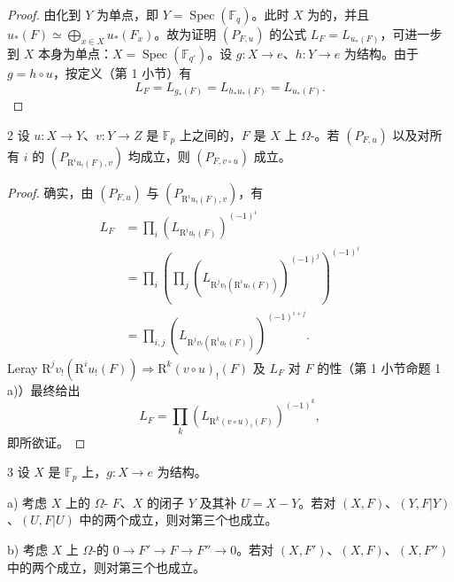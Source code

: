 \begin{proof}
由化到 $Y$ 为单点，即 $Y=\operatorname{Spec}(\mathbb F_q)$。此时 $X$ 为的，并且 $u_*(F)\simeq\bigoplus_{x\in X}u_*(F_x)$。故为证明 $(P_{F,u})$ 的公式 $L_F=L_{u_*(F)}$，可进一步到 $X$ 本身为单点：$X=\operatorname{Spec}(\mathbb F_{q'})$。设 $g:X\to e$、$h:Y\to e$ 为结构。由于 $g=h\circ u$，按定义（第 1 小节）有
\[
L_F=L_{g_*(F)}=L_{h_*u_*(F)}=L_{u_*(F)}.
\]
\end{proof}
\begin{SGAresult}{}{2}
设 $u:X\to Y$、$v:Y\to Z$ 是 $\mathbb F_p$ 上之间的，$F$ 是 $X$ 上 $\Omega$-。若 $(P_{F,u})$ 以及对所有 $i$ 的 $(P_{\mathrm R^iu_!(F),v})$ 均成立，则 $(P_{F,v\circ u})$ 成立。
\end{SGAresult}
\begin{proof}
确实，由 $(P_{F,u})$ 与 $(P_{\mathrm R^iu_!(F),v})$，有
\[
\begin{aligned}
L_F&=\prod_i(L_{\mathrm R^iu_!(F)})^{(-1)^i}\\
&=\prod_i\left(\prod_j(L_{\mathrm R^jv_!(\mathrm R^iu_!(F))})^{(-1)^j}\right)^{(-1)^i}\\
&=\prod_{i,j}(L_{\mathrm R^jv_!(\mathrm R^iu_!(F))})^{(-1)^{i+j}}.
\end{aligned}
\]
Leray  $\mathrm R^jv_!(\mathrm R^iu_!(F))\Rightarrow\mathrm R^k(v\circ u)_!(F)$ 及 $L_F$ 对 $F$ 的性（第 1 小节命题 1 a)）最终给出
\[
L_F=\prod_k(L_{\mathrm R^k(v\circ u)_!(F)})^{(-1)^k},
\]
即所欲证。
\end{proof}
\begin{SGAresult}{}{3}
设 $X$ 是 $\mathbb F_p$ 上，$g:X\to e$ 为结构。

a) 考虑 $X$ 上的 $\Omega$- $F$、$X$ 的闭子 $Y$ 及其补 $U=X-Y$。若对 $(X,F)$、$(Y,F|Y)$、$(U,F|U)$ 中的两个成立，则对第三个也成立。

b) 考虑 $X$ 上 $\Omega$-的 $0\to F'\to F\to F''\to0$。若对 $(X,F')$、$(X,F)$、$(X,F'')$ 中的两个成立，则对第三个也成立。
\end{SGAresult}
